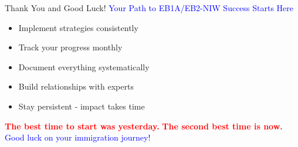 \documentclass[11pt]{beamer}
\begin{document}
	\begin{frame}{Thank You and Good Luck!}
		\centering
		\vspace{0.5cm}
		\textcolor{blue}{\Large Your Path to EB1A/EB2-NIW Success Starts Here}
		\vspace{0.3cm}
		\small
		\begin{itemize}
			\item Implement strategies consistently
			\item Track your progress monthly
			\item Document everything systematically
			\item Build relationships with experts
			\item Stay persistent - impact takes time
		\end{itemize}
		\vspace{0.3cm}
		\textcolor{red}{\textbf{The best time to start was yesterday.}}
		\textcolor{red}{\textbf{The second best time is now.}}
		\vspace{0.3cm}
		\textcolor{blue}{\Large Good luck on your immigration journey!}
	\end{frame}
	
\end{document}
